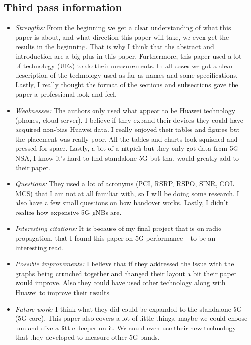 \documentclass[letterpaper,twocolumn,10pt]{article}
\begin{document}
\subsection{Third pass information}
\label{sec:third}
\begin{itemize}

\item {\it Strengths:} 
From the beginning we get a clear understanding of what this paper is about, and what direction this paper will take,
we even get the results in the beginning. That is why I think that the abstract and introduction are a big plus in this paper.
Furthermore, this paper used a lot of technology (UEs) to do their measurements. In all cases we got a clear description of
the technology used as far as names and some specifications. Lastly, I really thought the format of the sections and subsections
gave the paper a professional look and feel.

\item {\it Weaknesses:} 
The authors only used what appear to be Huawei technology (phones, cloud server). I believe if they expand their 
devices they could have acquired non-bias Huawei data. I really enjoyed their tables and figures but the placement 
was really poor. All the tables and charts look squished and pressed for space. Lastly, a bit of a nitpick but they only
got data from 5G NSA, I know it's hard to find standalone 5G but that would greatly add to their paper. 

\item {\it Questions:} 
They used a lot of acronyms (PCI, RSRP, RSPO, SINR, COL, MCS) that I am not at all familiar with, so I will be doing
some research. I also have a few small questions on how handover works. Lastly, I didn't realize how expensive 5G gNBs
are. 

\item {\it Interesting citations:} 
It is because of my final project that is on radio propagation, that I found this paper on 5G performance
~\cite{5gnetworkper} to be an interesting read. 

\item {\it Possible improvements:} 
I believe that if they addressed the issue with the graphs being crunched together and changed their layout a bit
their paper would improve. Also they could have used other technology along with Huawei to improve their results. 

\item {\it Future work:} 
I think what they did could be expanded to the standalone 5G (5G core). This paper also covers a lot of little things, 
maybe we could choose one and dive a little deeper on it. We could even use their new technology that they developed
to measure other 5G bands. 

\end{itemize}

{
  \small 
  
  
}
\end{document}
